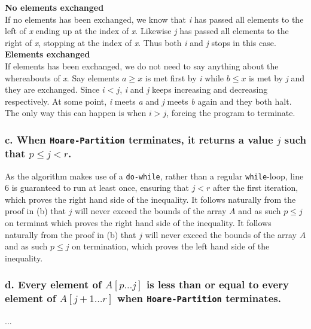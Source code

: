 \documentclass[11pt,english]{article}
\begin{document}
\textbf{No elements exchanged}\\
If no elements has been exchanged, we know that \textit{i} has passed all
elements to the left of \textit{x} ending up at the index of \textit{x}.
Likewise \textit{j} has passed all elements to the right of \textit{x},
stopping at the index of \textit{x}. Thus both \textit{i} and \textit{j}
stops in this case.\\

\textbf{Elements exchanged}\\
If elements has been exchanged, we do not need to say anything about the
whereabouts of \textit{x}. Say elements $a \geq x$ is met first by \textit{i}
while $b \leq x$ is met by \textit{j} and they are exchanged. Since
$i<j$, \textit{i} and \textit{j} keeps increasing and decreasing respectively.
At some point, \textit{i} meets \textit{a} and \textit{j} meets \textit{b}
again and they both halt. The only way this can happen is when $i>j$, forcing
the program to terminate.

\subsubsection*{\large c. \mdseries When \texttt{Hoare-Partition} terminates,
it returns a value $j$ such that $p \leq j < r$.}
As the algorithm makes use of a \texttt{do-while}, rather than a regular
\texttt{while}-loop, line 6 is guaranteed to run at least once, ensuring that
$j < r$ after the first iteration, which proves the right hand side of the
inequality. It follows naturally from the proof in (b) that $j$ will never
exceed the bounds of the array $A$ and as such $p \leq j$ on terminat which
proves the right hand side of the inequality. It follows naturally from the
proof in (b) that $j$ will never exceed the bounds of the array $A$ and as
such $p \leq j$ on termination, which proves the left hand side of the
inequality. 

\subsubsection*{\large d. \mdseries Every element of $A[p \dots j]$ is less
than or equal to every element of $A[j + 1 \dots r]$ when
\texttt{Hoare-Partition} terminates.}
...
\end{document}
